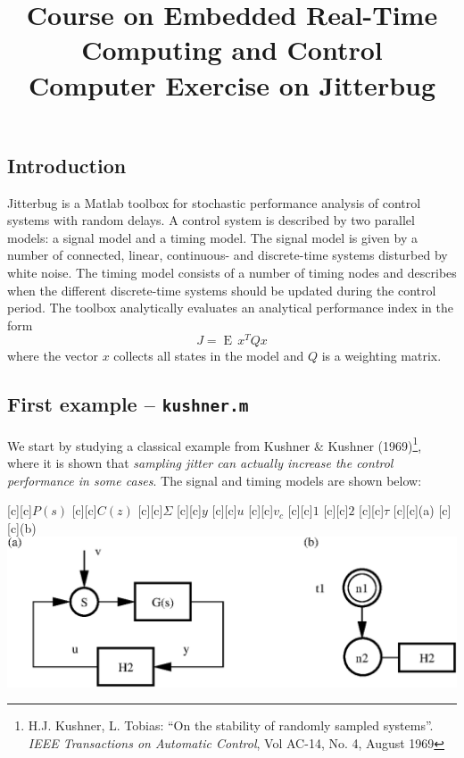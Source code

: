 \documentclass[final,twoside]{rapport}  %
\DeclareMathOperator{\E}{E\,}
\begin{document}
\thispagestyle{empty}
\setlength{\parindent}{0pt}
\setlength{\parskip}{1em plus 0.1em minus 0.1em}

\begin{paperhead}
\vspace{-1cm}
\title{Course on Embedded Real-Time
  Computing and Control\\[1em]Computer Exercise on Jitterbug}
\author{}
\end{paperhead}

\vspace*{-2.5cm}

\subsection*{Introduction}

Jitterbug is a Matlab toolbox for stochastic performance analysis of
control systems with random delays. A control system is described by
two parallel models: a signal model and a timing model. The signal
model is given by a number of connected, linear, continuous- and
discrete-time systems disturbed by white noise. The timing model
consists of a number of timing nodes and describes when the different
discrete-time systems should be updated during the control period.
The toolbox analytically evaluates an analytical performance index in
the form
\[
J = \E x^T Q x
\]
where the vector $x$ collects all states in the model and $Q$ is a
weighting matrix.

\subsection*{First example -- \texttt{kushner.m}}

We start by studying a classical example from  Kushner \& Kushner
(1969)\footnote{H.J. Kushner, L. Tobias: ``On the stability of
  randomly sampled systems''. {\em IEEE Transactions on Automatic
    Control}, Vol AC-14, No. 4, August 1969}, where it is shown that
{\em sampling jitter can actually
increase 
the control performance in some cases}. The signal and timing models
are shown below:
\bigskip

  \centerline{
    \small
  [c][c]{$P(s)$}
  [c][c]{$C(z)$}
  [c][c]{$\Sigma$}
  [c][c]{$y$}
  [c][c]{$u$}
  [c][c]{$v_c$}
  [c][c]{$1$}
  [c][c]{$2$}
  [c][c]{$\tau$}
  [c][c]{\small (a)}
  [c][c]{\small (b)}
  \includegraphics[scale=0.63]{kushner.eps}
  }
\end{document}
